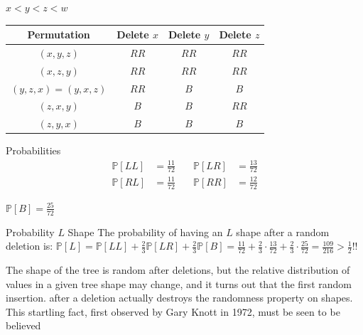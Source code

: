 \documentclass{beamer}
\begin{document}
\begin{frame}
    $x < y < z < w$
    \begin{center}
        \begin{tabular}{||c c c c||} 
            \hline
            Permutation& Delete $x$& Delete $y$ & Delete $z$ \\ [0.5ex] 
            \hline\hline
            $(x,y,z)$ & $RR$ & $RR$ & $RR$ \\ 
            \hline
            $(x,z,y)$ & $RR$ & $RR$ & $RR$ \\  
            \hline
            $(y,z,x) = (y,x,z)$ & $RR$ & $B$ & $B$\\ 
            \hline
            $(z,x,y)$ & $B$ & $B$ & $RR$\\ 
            \hline
            $(z,y,x)$ & $B$ & $B$ & $B$ \\ 
            \hline
        \end{tabular}
    \end{center}
\end{frame}

\begin{frame}{Probabilities}
    \begin{align*}
        \mathbb{P}[LL] &= \frac{11}{72} & \quad \mathbb{P}[LR] &= \frac{13}{72} \\
        \mathbb{P}[RL] &= \frac{11}{72} & \quad \mathbb{P}[RR] &= \frac{12}{72}
    \end{align*}

    \begin{center}
        $\mathbb{P}[B] = \frac{25}{72}$
    \end{center}
    \pause
    \begin{block}{Probability $L$ Shape}
        The probability of having an $L$ shape after a random deletion is: $\mathbb{P}[L] = \mathbb{P}[LL] + \frac{2}{3}  \mathbb{P}[LR] + \frac{2}{3} \mathbb{P}[B] = \frac{11}{72} + \frac{2}{3} \cdot \frac{13}{72} + \frac{2}{3} \cdot \frac{25}{72} = \frac{109}{216} > \frac{1}{2}$!!
    \end{block}
\end{frame}

\begin{frame}
    \begin{block}{\cite{knuth1998art}}
        The shape of the tree is random after deletions, but the relative distribution of values in a given tree shape may change, and it turns out that the first random insertion. after a deletion actually destroys the randomness property on shapes. This startling fact, first observed by Gary Knott in 1972, must be seen to be believed
    \end{block}
\end{frame}
\end{document}
